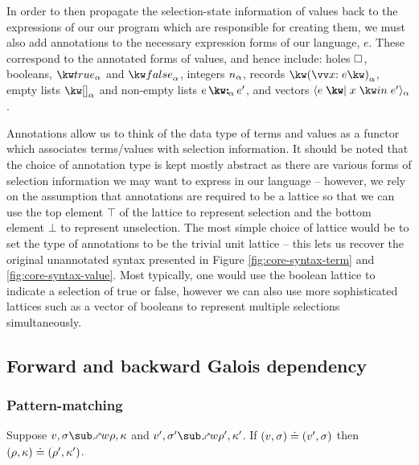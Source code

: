 In order to then propagate the selection-state information of values back to the expressions of our our program which are responsible for creating them, we must also add annotations to the necessary expression forms of our language, $e$. These correspond to the annotated forms of values, and hence include: holes $\square$, booleans, $\annTrue{\alpha}$ and $\annFalse{\alpha}$, integers $n_{\alpha}$, records $\annRec{\vec{\bind{x}{e}}}{\alpha}$, empty lists $\annNil{\alpha}$ and non-empty lists $\annCons{e}{e'}{\alpha}$, and vectors $\annVec{e}{x}{e'}{\alpha}$.

Annotations allow us to think of the data type of terms and values as a functor which associates terms/values with selection information. It should be noted that the choice of annotation type is kept mostly abstract as there are various forms of selection information we may want to express in our language -- however, we rely on the assumption that annotations are required to be a lattice so that we can use the top element $\top$ of the lattice to represent selection and the bottom element $\bot$ to represent unselection. The most simple choice of lattice would be to set the type of annotations to be the trivial unit lattice -- this lets us recover the original unannotated syntax presented in Figure \ref{fig:core-syntax-term} and \ref{fig:core-syntax-value}. Most typically, one would use the boolean lattice to indicate a selection of true or false, however we can also use more sophisticated lattices such as a vector of booleans to represent multiple selections simultaneously.

\subsection{Forward and backward Galois dependency}
\label{sec:core-language:fwd-bwd}

\subsubsection{Pattern-matching}




\begin{lemma}
   Suppose $v, \sigma \matchFwdR{w} \rho, \kappa$ and $v', \sigma' \matchFwdR{w} \rho', \kappa'$. If $(v, \sigma) \doteq (v', \sigma)$ then $(\rho, \kappa) \doteq (\rho', \kappa')$.
\end{lemma}

